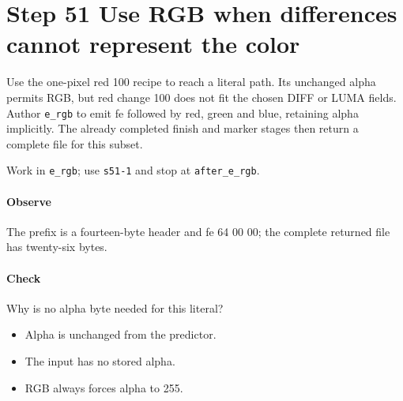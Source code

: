 \section{Step 51 Use RGB when differences cannot represent the color}\label{qoi-s51}
Use the one-pixel red 100 recipe to reach a literal path. Its unchanged alpha permits RGB, but red change 100 does not fit the chosen DIFF or LUMA fields. Author \texttt{e\_rgb} to emit fe followed by red, green and blue, retaining alpha implicitly. The already completed finish and marker stages then return a complete file for this subset.

Work in \texttt{e\_rgb}; use \texttt{s51-1} and stop at \texttt{after\_e\_rgb}.

\paragraph{Observe} The prefix is a fourteen-byte header and fe 64 00 00; the complete returned file has twenty-six bytes.

\paragraph{Check} Why is no alpha byte needed for this literal?
\begin{itemize}
  \item[A.] Alpha is unchanged from the predictor.
  \item[B.] The input has no stored alpha.
  \item[C.] RGB always forces alpha to 255.
\end{itemize}
